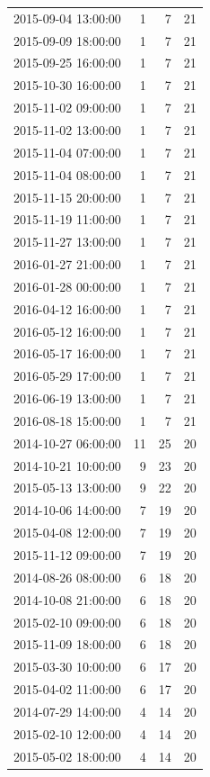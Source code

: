 \begin{tabular}{lrrr}
2015-09-04 13:00:00 & 1 & 7 & 21 \\
2015-09-09 18:00:00 & 1 & 7 & 21 \\
2015-09-25 16:00:00 & 1 & 7 & 21 \\
2015-10-30 16:00:00 & 1 & 7 & 21 \\
2015-11-02 09:00:00 & 1 & 7 & 21 \\
2015-11-02 13:00:00 & 1 & 7 & 21 \\
2015-11-04 07:00:00 & 1 & 7 & 21 \\
2015-11-04 08:00:00 & 1 & 7 & 21 \\
2015-11-15 20:00:00 & 1 & 7 & 21 \\
2015-11-19 11:00:00 & 1 & 7 & 21 \\
2015-11-27 13:00:00 & 1 & 7 & 21 \\
2016-01-27 21:00:00 & 1 & 7 & 21 \\
2016-01-28 00:00:00 & 1 & 7 & 21 \\
2016-04-12 16:00:00 & 1 & 7 & 21 \\
2016-05-12 16:00:00 & 1 & 7 & 21 \\
2016-05-17 16:00:00 & 1 & 7 & 21 \\
2016-05-29 17:00:00 & 1 & 7 & 21 \\
2016-06-19 13:00:00 & 1 & 7 & 21 \\
2016-08-18 15:00:00 & 1 & 7 & 21 \\
2014-10-27 06:00:00 & 11 & 25 & 20 \\
2014-10-21 10:00:00 & 9 & 23 & 20 \\
2015-05-13 13:00:00 & 9 & 22 & 20 \\
2014-10-06 14:00:00 & 7 & 19 & 20 \\
2015-04-08 12:00:00 & 7 & 19 & 20 \\
2015-11-12 09:00:00 & 7 & 19 & 20 \\
2014-08-26 08:00:00 & 6 & 18 & 20 \\
2014-10-08 21:00:00 & 6 & 18 & 20 \\
2015-02-10 09:00:00 & 6 & 18 & 20 \\
2015-11-09 18:00:00 & 6 & 18 & 20 \\
2015-03-30 10:00:00 & 6 & 17 & 20 \\
2015-04-02 11:00:00 & 6 & 17 & 20 \\
2014-07-29 14:00:00 & 4 & 14 & 20 \\
2015-02-10 12:00:00 & 4 & 14 & 20 \\
2015-05-02 18:00:00 & 4 & 14 & 20 \\

\end{tabular}
